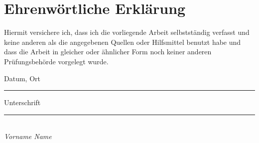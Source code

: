\chapter*{Ehrenwörtliche Erklärung}
Hiermit versichere ich, dass ich die vorliegende Arbeit selbstständig verfasst und keine anderen als die angegebenen Quellen oder Hilfsmittel benutzt habe und dass die Arbeit in gleicher oder ähnlicher Form noch keiner anderen Prüfungsbehörde vorgelegt wurde.

\vspace{20mm}

Datum, Ort \rule{5cm}{0.4pt}\hspace{1cm}Unterschrift \rule{5cm}{0.4pt}\\
{\small \textit{Vorname Name}}
